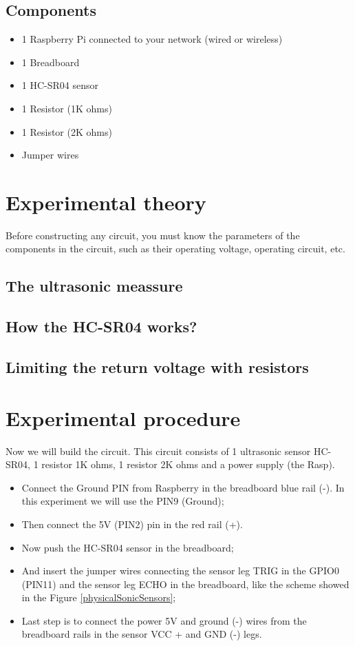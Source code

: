 \documentclass[10pt,twoside,english]{_support/latex/sbabook/sbabook}
\begin{document}
\subsection{Components}
\begin{itemize}
\item 1 Raspberry Pi connected to your network (wired or wireless)
\item 1 Breadboard
\item 1 HC-SR04 sensor
\item 1 Resistor (1K ohms)
\item 1 Resistor (2K ohms)
\item Jumper wires
\end{itemize}
\section{Experimental theory}
Before constructing any circuit, you must know the parameters of the components in the circuit, such as their operating voltage, operating circuit, etc.
\subsection{The ultrasonic meassure}\subsection{How the HC-SR04 works?}\subsection{Limiting the return voltage with resistors}\section{Experimental procedure}
Now we will build the circuit. This circuit consists of 1 ultrasonic sensor HC-SR04, 1 resistor 1K ohms, 1 resistor 2K ohms and a power supply (the Rasp).

\begin{itemize}
\item Connect the Ground PIN from Raspberry in the breadboard blue rail (-). In this experiment we will use the PIN9 (Ground);
\item Then connect the 5V (PIN2) pin in the red rail (+). 
\item Now push the HC-SR04 sensor in the breadboard;
\item And insert the jumper wires connecting the sensor leg TRIG in the GPIO0 (PIN11) and the sensor leg ECHO in the breadboard, like the scheme showed in the Figure \ref{physicalSonicSensors};
\item Last step is to connect the power 5V and ground (-) wires from the breadboard rails in the sensor VCC + and GND (-) legs.
\end{itemize}
\end{document}
